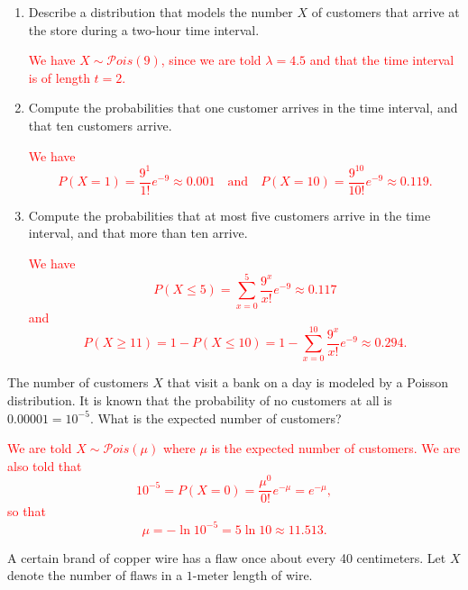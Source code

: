\documentclass[12pt,reqno]{amsart}
\begin{document}
\medskip
\begin{enumerate}
\item Describe a distribution that models the number $X$ of customers that arrive at the store during a two-hour time interval.

\bigskip
\textcolor{red}{We have $X\sim \mathcal{P}ois(9)$, since we are told $\lambda = 4.5$ and that the time interval is of length $t=2$.}
\bigskip

\item Compute the probabilities that one customer arrives in the time interval, and that ten customers arrive.

\bigskip
\textcolor{red}{We have
	\[P(X=1) = \frac{9^1}{1!}e^{-9} \approx 0.001 \quad \text{and} \quad P(X=10) = \frac{9^{10}}{10!}e^{-9} \approx 0.119.
	\]}
\bigskip

\item Compute the probabilities that at most five customers arrive in the time interval, and that more than ten arrive.

\bigskip
\textcolor{red}{We have
	\[P(X\leq 5) = \sum_{x=0}^5 \frac{9^x}{x!} e^{-9} \approx 0.117
	\]
and
	\[P(X\geq 11) = 1 - P(X\leq 10) = 1 - \sum_{x=0}^{10} \frac{9^x}{x!} e^{-9} \approx 0.294.
	\]}
\end{enumerate}













\bigskip
\prob The number of customers $X$ that visit a bank on a day is modeled by a Poisson distribution. It is known that the probability of no customers at all is $0.00001 = 10^{-5}$. What is the expected number of customers?

\bigskip
\textcolor{red}{We are told $X\sim \mathcal{P}ois(\mu)$ where $\mu$ is the expected number of customers. We are also told that
	\[10^{-5} = P(X=0) = \frac{\mu^0}{0!} e^{-\mu} = e^{-\mu},
	\]
so that
	\[\mu = -\ln{10^{-5}} = 5 \ln{10} \approx 11.513.
	\]}











\bigskip
\prob A certain brand of copper wire has a flaw once about every 40 centimeters. Let $X$ denote the number of flaws in a $1$-meter length of wire.
\end{document}
